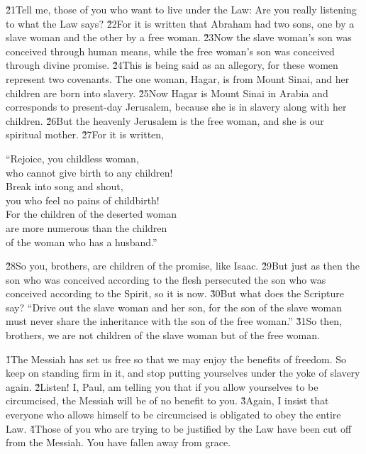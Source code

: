 \v{21}Tell me, those of you who want to live under the Law: Are you really listening to what the Law says? \v{22}For it is written that Abraham had two sons, one by a slave woman and the other by a free woman. \v{23}Now the slave woman's son was conceived through human means, while the free woman's son was conceived through divine promise. \v{24}This is being said as an allegory, for these women represent two covenants. The one woman, Hagar, is from Mount Sinai, and her children are born into slavery. \v{25}Now Hagar is Mount Sinai in Arabia and corresponds to present-day Jerusalem, because she is in slavery along with her children. \v{26}But the heavenly Jerusalem is the free woman, and she is our spiritual mother. \v{27}For it is written,

\begin{poetry}
\poeml ``Rejoice, you childless woman, \\
\poemll    who cannot give birth to any children! \\
\poeml Break into song and shout, \\
\poemll    you who feel no pains of childbirth! \\
\poeml For the children of the deserted woman \\
\poemll    are more numerous than the children \\
\poemlll       of the woman who has a husband.''
\end{poetry}

\v{28}So you, brothers, are children of the promise, like Isaac. \v{29}But just as then the son who was conceived according to the flesh persecuted the son who was conceived according to the Spirit, so it is now. \v{30}But what does the Scripture say? ``Drive out the slave woman and her son, for the son of the slave woman must never share the inheritance with the son of the free woman.'' \v{31}So then, brothers, we are not children of the slave woman but of the free woman.

\v{1}The Messiah has set us free so that we may enjoy the benefits of freedom. So keep on standing firm in it, and stop putting yourselves under the yoke of slavery again. \v{2}Listen! I, Paul, am telling you that if you allow yourselves to be circumcised, the Messiah will be of no benefit to you. \v{3}Again, I insist that everyone who allows himself to be circumcised is obligated to obey the entire Law. \v{4}Those of you who are trying to be justified by the Law have been cut off from the Messiah. You have fallen away from grace.

